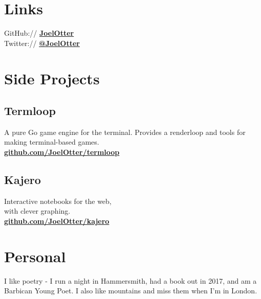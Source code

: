 \documentclass[]{deedy-resume-openfont}
\begin{document}
\begin{minipage}[t]{0.33\textwidth}

\section{Links} 
GitHub:// \href{http://github.com/JoelOtter}{\bf{JoelOtter}} \\
Twitter://  \href{http://twitter.com/JoelOtter}{\bf{@JoelOtter}} \\
\sectionsep


\section{Side Projects}
\subsection{Termloop}
A pure Go game engine for the terminal. Provides a renderloop and tools for making terminal-based games.\\
\href{http://github.com/JoelOtter/termloop}{\bf{github.com/JoelOtter/termloop}}
\sectionsep
\subsection{Kajero}
Interactive notebooks for the web,\\with clever graphing.\\
\href{http://github.com/JoelOtter/kajero}{\bf{github.com/JoelOtter/kajero}}
\sectionsep

\section{Personal}
I like poetry - I run a night in Hammersmith, had a book out in 2017, and am a Barbican Young Poet. I also like mountains and miss them when I'm in London.

%
%

\end{minipage} 
\hfill
\end{document}
